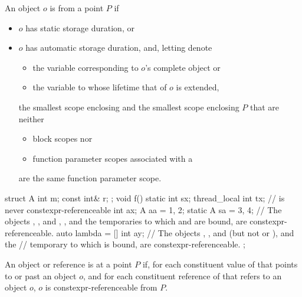 \pnum
An object $o$ is  from a point $P$ if
\begin{itemize}
\item
$o$ has static storage duration, or
\item
$o$ has automatic storage duration, and, letting  denote
\begin{itemize}
\item
the variable corresponding to $o$'s complete object or
\item
the variable to whose lifetime that of $o$ is extended,
\end{itemize}
the smallest scope enclosing  and the smallest scope enclosing $P$
that are neither
\begin{itemize}
\item
block scopes nor
\item
function parameter scopes associated with
a 
\end{itemize}
are the same function parameter scope.
\end{itemize}
\begin{example}
\begin{codeblock}
struct A {
  int m;
  const int& r;
};
void f() {
  static int sx;
  thread_local int tx;                  //  is never constexpr-referenceable
  int ax;
  A aa = {1, 2};
  static A sa = {3, 4};
  // The objects , , and , , and the temporaries to which  and  are bound, are constexpr-referenceable.
  auto lambda = [] {
    int ay;
    // The objects , , and  (but not  or ), and the
    // temporary to which  is bound, are constexpr-referenceable.
  };
}
\end{codeblock}
\end{example}

\pnum
An object or reference  is
 at a point $P$ if,
for each constituent value of  that points to or past an object $o$,
and for each constituent reference of  that refers to an object $o$,
$o$ is constexpr-referenceable from $P$.

